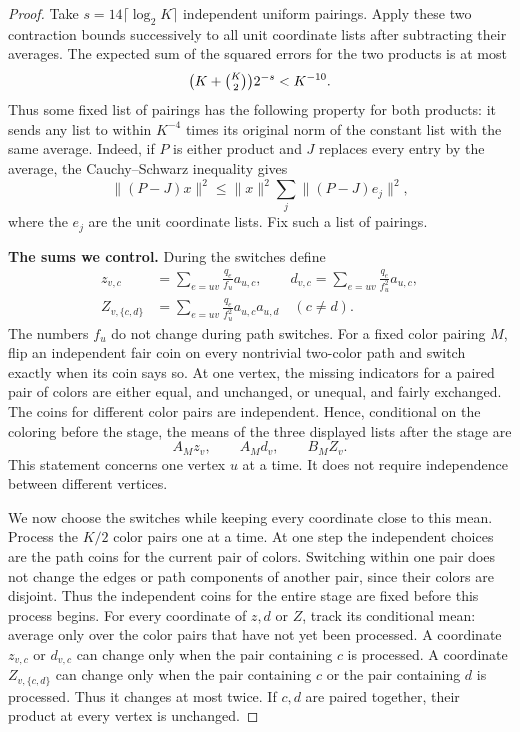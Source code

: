 \documentclass[11pt]{article}
\theoremstyle{definition}\newtheorem{algorithm}{Algorithm}[section]
\numberwithin{equation}{section}
\theoremstyle{remark}\newtheorem*{remark}{Remark}
\begin{document}
\begin{proof}
Take $s=14\lceil\log_2K\rceil$ independent uniform pairings. Apply these
two contraction bounds successively to all unit coordinate lists after
subtracting their averages. The expected sum of the squared errors for
the two products is at most
\[
 \bigl(K+\tbinom K2\bigr)2^{-s}<K^{-10}.
\]
Thus some fixed list of pairings has the following property for both
products: it sends any list to within $K^{-4}$ times its original norm
of the constant list with the same average. Indeed, if $P$ is either product and $J$ replaces every entry by the
average, the Cauchy--Schwarz inequality gives
\[
 \|(P-J)x\|^2\le\|x\|^2\sum_j\|(P-J)e_j\|^2,
\]
where the $e_j$ are the unit coordinate lists. Fix such a list of pairings.

\medskip\noindent\textbf{The sums we control.}
During the switches define
\begin{align*}
 z_{v,c}&=\sum_{e=uv}\frac{q_e}{f_u}a_{u,c},\qquad
 d_{v,c}=\sum_{e=uv}\frac{q_e}{f_u^2}a_{u,c},\\
 Z_{v,\{c,d\}}&=
       \sum_{e=uv}\frac{q_e}{f_u^2}a_{u,c}a_{u,d}\quad(c\ne d).
\end{align*}
The numbers $f_u$ do not change during path switches. For a fixed
color pairing $M$, flip an independent fair coin on every nontrivial
two-color path and switch exactly when its coin says so. At one vertex,
the missing indicators for a paired pair of colors are either equal,
and unchanged, or unequal, and fairly exchanged. The coins for different
color pairs are independent. Hence, conditional on the coloring before
the stage, the means of the three displayed lists after the stage are
\[
 A_Mz_v,\qquad A_Md_v,\qquad B_MZ_v.
\]
This statement concerns one vertex $u$ at a time. It does not require
independence between different vertices.

We now choose the switches while keeping every coordinate close to this
mean. Process the $K/2$ color pairs one at a time. At one step the
independent choices are the path coins for the current pair of colors.
Switching within one pair does not change the edges or path components
of another pair, since their colors are disjoint. Thus the independent
coins for the entire stage are fixed before this process begins.
For every coordinate of $z,d$ or $Z$, track its conditional mean: average
only over the color pairs that have not yet been processed. A coordinate
$z_{v,c}$ or $d_{v,c}$ can change only when the pair containing $c$ is processed. A
coordinate $Z_{v,\{c,d\}}$ can change only when the pair containing $c$
or the pair containing $d$ is processed. Thus it changes at most twice.
If $c,d$ are paired together, their product at every vertex is unchanged.


\end{proof}
\end{document}
